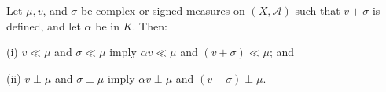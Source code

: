 Let $\mu, v$, and $\sigma$ be complex or signed measures on $(X, \mathcal{A})$ such that $v + \sigma$ is defined, and let $\alpha$ be in $K$. Then:

(i) $v \ll \mu$ and $\sigma \ll \mu$ imply $\alpha v \ll \mu$ and $(v + \sigma) \ll \mu$; and

(ii) $v \perp \mu$ and $\sigma \perp \mu$ imply $\alpha v \perp \mu$ and $(v + \sigma) \perp \mu$.